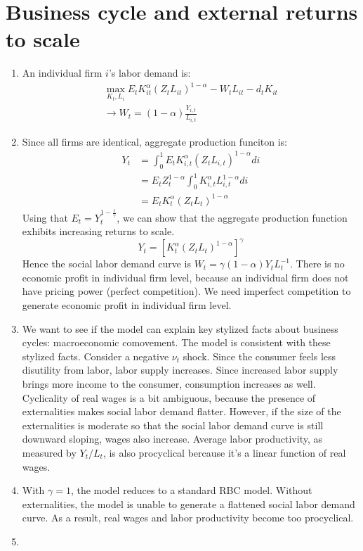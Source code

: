 \documentclass[11pt]{amsart}
\begin{document}
\section{Business cycle and external returns to scale}
\begin{enumerate}[label=(\alph*)]
	\item An individual firm $i$'s labor demand is: 
	\begin{equation*}
	\left.\begin{array} { c } { \max _ { K _ { t } ,L _ { i } } E _ { t } K _ { i t } ^ { \alpha } \left( Z _ { t } L _ { i t } \right) ^ { 1- \alpha } - W _ { t } L _ { i t } - d _ { t } K _ { i t } } \\  \rightarrow { W _ { t } = ( 1- \alpha ) \frac{Y_{i,t}}{L_{i,t}} } \end{array} \right.
	\end{equation*}
	\item Since all firms are identical, aggregate production funciton is:
	\begin{align*}
	Y_t &= \int_{0}^{1} E_t K_{i,t}^\alpha \left( Z_t L_{i,t} \right)^{1-\alpha} di \\
	& = E_t Z_t^{1-\alpha} \int_{0}^{1} K_{i,t}^\alpha  L_{i,t}^{1-\alpha} di \\
	& = E_t K_t^\alpha (Z_t L_t)^{1-\alpha}
	\end{align*}
	Using that $E_t = Y_t^{1- \frac{1}{\gamma}}$, we can show that the aggregate production function exhibits increasing returns to scale. 
	\begin{equation*}
	Y _ { t } = \left[ K _ { t } ^ { \alpha } \left( Z _ { t } L _ { t } \right) ^ { 1- \alpha } \right] ^ { \gamma }
	\end{equation*}
	Hence the social labor demand curve is $W _ { t } = \gamma ( 1- \alpha ) Y _ { t } L _ { t } ^ { - 1}$. There is no economic profit in individual firm level, because an individual firm does not have pricing power (perfect competition). We need imperfect competition to generate economic profit in individual firm level. 
	\item We want to see if the model can explain key stylized facts about business cycles: macroeconomic comovement. The model is consistent with these stylized facts. Consider a negative $\nu_t$ shock. Since the consumer feels less disutility from labor, labor supply increases. Since increased labor supply brings more income to the consumer, consumption increases as well. Cyclicality of real wages is a bit ambiguous, because the presence of externalities makes social labor demand flatter. However, if the size of the externalities is moderate so that the social labor demand curve is still downward sloping, wages also increase. Average labor productivity, as measured by $Y_t/L_t$, is also procyclical bercause it's a linear function of real wages. 
	
	\item With $\gamma = 1$, the model reduces to a standard RBC model. Without externalities, the model is unable to generate a flattened social labor demand curve. As a result, real wages and labor productivity become too procyclical. 
	\item
\end{enumerate}
\end{document}
